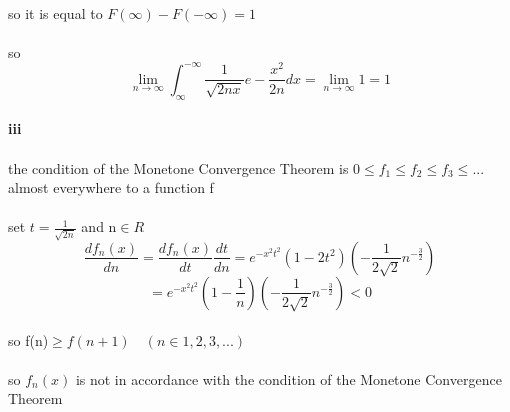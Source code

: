 \documentclass{article}
\begin{document}
\paragraph{}{so it is equal to $F(\infty)-F(-\infty)=1$
\paragraph{}{so \begin{displaymath}
                  \lim_{n\to \infty} \int_{\infty}^{-\infty}\frac{1}{\sqrt{2nx}}e-\frac{x^{2}}{2n}dx=\lim_{n\to \infty}1=1
                \end{displaymath}}
\paragraph{}{ }
\paragraph{}{ }
\paragraph{iii}
\paragraph{}{the condition of the Monetone Convergence Theorem is $0\le f_{1}\le f_{2}\le f_{3}\le...$ almost everywhere to a function f}
\paragraph{}{set $t=\frac{1}{\sqrt{2n}}$ and n$ \in R$}
\begin{displaymath}
  \frac{df_{n}(x)}{dn}=\frac{df_{n}(x)}{dt}\frac{dt}{dn}=e^{-x^{2}t^{2}}(1-2t^{2})(-\frac{1}{2\sqrt{2}}n^{-\frac{3}{2}})
\end{displaymath}
\begin{displaymath}
  =e^{-x^{2}t^{2}}(1-\frac{1}{n})(-\frac{1}{2\sqrt{2}}n^{-\frac{3}{2}})<0
\end{displaymath}
\paragraph{}{so f(n)$\ge f(n+1)\quad (n\in {1,2,3,...})$}
\paragraph{}{so $f_{n}(x)$ is not in accordance with the condition of the Monetone Convergence Theorem}
}
\end{document}
